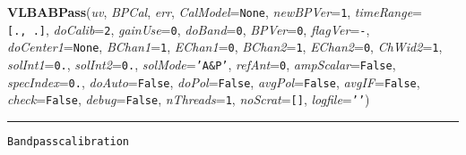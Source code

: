     \label{VLBACal:VLBABPass}
    \vspace{0.5ex}

    \begin{boxedminipage}{\textwidth}

    \raggedright \textbf{VLBABPass}(\textit{uv}, \textit{BPCal}, \textit{err}, \textit{CalModel}=\texttt{N\-o\-n\-e\-}, \textit{newBPVer}=\texttt{1\-}, \textit{timeRange}=\texttt{[\-.\-,\-~\-.\-]\-}, \textit{doCalib}=\texttt{2\-}, \textit{gainUse}=\texttt{0\-}, \textit{doBand}=\texttt{0\-}, \textit{BPVer}=\texttt{0\-}, \textit{flagVer}=\texttt{-\-}, \textit{doCenter1}=\texttt{N\-o\-n\-e\-}, \textit{BChan1}=\texttt{1\-}, \textit{EChan1}=\texttt{0\-}, \textit{BChan2}=\texttt{1\-}, \textit{EChan2}=\texttt{0\-}, \textit{ChWid2}=\texttt{1\-}, \textit{solInt1}=\texttt{0\-.\-}, \textit{solInt2}=\texttt{0\-.\-}, \textit{solMode}=\texttt{'\-A\-\&\-P\-'\-}, \textit{refAnt}=\texttt{0\-}, \textit{ampScalar}=\texttt{F\-a\-l\-s\-e\-}, \textit{specIndex}=\texttt{0\-.\-}, \textit{doAuto}=\texttt{F\-a\-l\-s\-e\-}, \textit{doPol}=\texttt{F\-a\-l\-s\-e\-}, \textit{avgPol}=\texttt{F\-a\-l\-s\-e\-}, \textit{avgIF}=\texttt{F\-a\-l\-s\-e\-}, \textit{check}=\texttt{F\-a\-l\-s\-e\-}, \textit{debug}=\texttt{F\-a\-l\-s\-e\-}, \textit{nThreads}=\texttt{1\-}, \textit{noScrat}=\texttt{[\-]\-}, \textit{logfile}=\texttt{'\-'\-})

    \vspace{-1.5ex}

    \rule{\textwidth}{0.5\fboxrule}
\begin{alltt}
Bandpass calibration


\end{alltt}
\end{boxedminipage}

